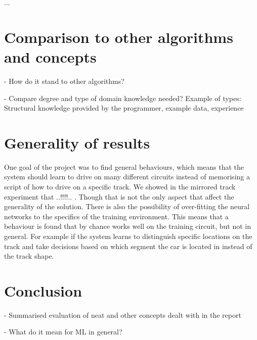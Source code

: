 ...

\section{Comparison to other algorithms and concepts}
- How do it stand to other algorithms?

- Compare degree and type of domain knowledge needed? Example of types: Structural knowledge provided by the programmer, example data, experience




\section{Generality of results}
One goal of the project was to find general behaviours, which means that the system should learn to drive on many different circuits instead of memorising a script of how to drive on a specific track. We showed in the mirrored track experiment that ..!!!!.. . Though that is not the only aspect that affect the generality of the solution. 
There is also the possibility of over-fitting the neural networks to the specifics of the training environment. This means that a behaviour is found that by chance works well on the training circuit, but not in general. For example if the system learns to distinguish specific locations on the track and take decisions based on which segment the car is located in instead of the track shape.


\section{Conclusion}
- Summarised evaluation of neat and other concepts dealt with in the report

- What do it mean for ML in general?




